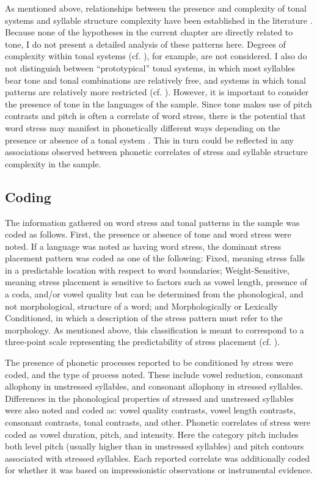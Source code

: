   As mentioned above, relationships between the presence and complexity of tonal systems and syllable structure complexity have been established in the literature \citep{Maddieson2013d}. Because none of the hypotheses in the current chapter are directly related to tone, I do not present a detailed analysis of these patterns here. Degrees of complexity within tonal systems (cf. \citealt{Maddieson2013d}), for example, are not considered. I also do not distinguish between ``prototypical'' tonal systems, in which most syllables bear tone and tonal combinations are relatively free, and systems in which tonal patterns are relatively more restricted (cf. \citealt{Hyman2009}). However, it is important to consider the presence of tone in the languages of the sample. Since tone makes use of pitch contrasts and pitch is often a correlate of word stress, there is the potential that word stress may manifest in phonetically different ways depending on the presence or absence of a tonal system \citep{Gordon2011}. This in turn could be reflected in any associations observed between phonetic correlates of stress and syllable structure complexity in the sample. 

\subsection{Coding}\label{sec:5.2.2}

  The information gathered on word stress and tonal patterns in the sample was coded as follows. First, the presence or absence of tone and word stress were noted. If a language was noted as having word stress, the dominant stress placement pattern was coded as one of the following: Fixed, meaning stress falls in a predictable location with respect to word boundaries; Weight-Sensitive, meaning stress placement is sensitive to factors such as vowel length, presence of a coda, and/or vowel quality but can be determined from the phonological, and not morphological, structure of a word; and Morphologically or Lexically Conditioned, in which a description of the stress pattern must refer to the morphology. As mentioned above, this classification is meant to correspond to a three-point scale representing the predictability of stress placement (cf. \citealt{Schiering2007}). 

  The presence of phonetic processes reported to be conditioned by stress were coded, and the type of process noted. These include vowel reduction, consonant allophony in unstressed syllables, and consonant allophony in stressed syllables. Differences in the phonological properties of stressed and unstressed syllables were also noted and coded as: vowel quality contrasts, vowel length contrasts, consonant contrasts, tonal contrasts, and other. Phonetic correlates of stress were coded as vowel duration, pitch, and intensity. Here the category pitch includes both level pitch (usually higher than in unstressed syllables) and pitch contours associated with stressed syllables. Each reported correlate was additionally coded for whether it was based on impressionistic observations or instrumental evidence.

